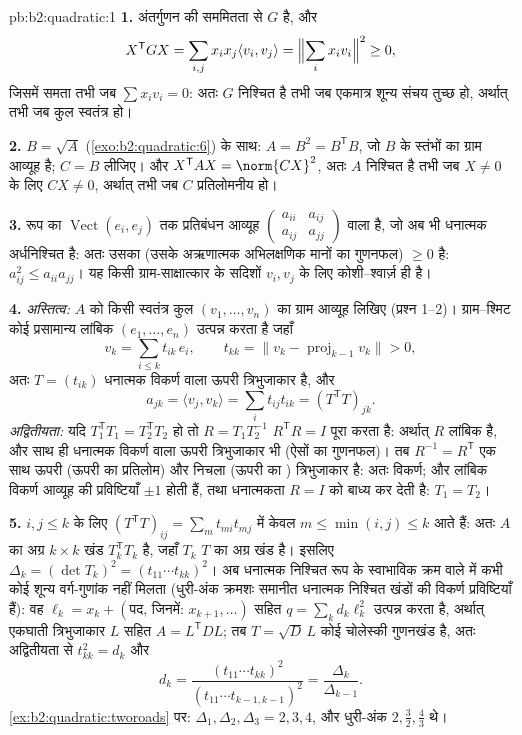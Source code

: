 \begin{solution}{pb:b2:quadratic:1}
\textbf{1.} अंतर्गुणन की सममितता से $G$  है, और
\[
X^{\mathsf T}GX = \sum_{i,j}x_ix_j\langle v_i, v_j\rangle
= \Bigl\|\sum_i x_iv_i\Bigr\|^2 \geq 0 ,
\]
जिसमें समता तभी जब $\sum x_iv_i = 0$: अतः $G$ निश्चित है तभी जब एकमात्र शून्य संचय
तुच्छ हो, अर्थात् तभी जब कुल स्वतंत्र हो।

\textbf{2.} $B = \sqrt A$ (\cref{exo:b2:quadratic:6}) के साथ: $A
= B^2 = B^{\mathsf T}B$, जो $B$ के स्तंभों का ग्राम आव्यूह है;
$C = B$ लीजिए। और $X^{\mathsf T}AX = \norm{CX}^2$, अतः $A$ निश्चित है तभी जब $X \neq 0$ के लिए $CX \neq 0$, अर्थात् तभी
जब $C$ प्रतिलोमनीय हो।

\textbf{3.} रूप का $\operatorname{Vect}(e_i, e_j)$ तक प्रतिबंधन आव्यूह $\begin{pmatrix} a_{ii} & a_{ij}\\ a_{ij} & a_{jj}
\end{pmatrix}$ वाला है, जो अब भी धनात्मक
अर्धनिश्चित है: अतः उसका  (उसके अऋणात्मक अभिलक्षणिक मानों का
गुणनफल) $\geq 0$ है: $a_{ij}^2 \leq a_{ii}a_{jj}$। यह किसी ग्राम-साक्षात्कार के सदिशों $v_i, v_j$ के लिए
कोशी--श्वार्ज़ ही है।

\textbf{4.} \emph{अस्तित्व:} $A$ को किसी स्वतंत्र कुल $(v_1, \dots, v_n)$ का ग्राम आव्यूह
लिखिए (प्रश्न 1--2)। ग्राम--श्मिट कोई प्रसामान्य लांबिक $(e_1, \dots, e_n)$ उत्पन्न करता
है जहाँ
\[
v_k = \sum_{i \leq k} t_{ik}\,e_i,
\qquad t_{kk} = \bigl\| v_k - \operatorname{proj}_{k-1}v_k
\bigr\| > 0 ,
\]
अतः $T = (t_{ik})$ धनात्मक विकर्ण वाला ऊपरी त्रिभुजाकार है, और
\[
a_{jk} = \langle v_j, v_k\rangle
= \sum_i t_{ij}t_{ik} = (T^{\mathsf T}T)_{jk} .
\]
\emph{अद्वितीयता:} यदि $T_1^{\mathsf T}T_1 = T_2^{\mathsf T}T_2$ हो तो $R = T_1T_2^{-1}$ $R^{\mathsf T}R = I$ पूरा करता है: अर्थात् $R$
लांबिक है, और साथ ही धनात्मक विकर्ण वाला ऊपरी त्रिभुजाकार भी (ऐसों का
गुणनफल)। तब $R^{-1} = R^{\mathsf T}$ एक साथ ऊपरी (ऊपरी का प्रतिलोम) और निचला (ऊपरी का
) त्रिभुजाकार है: अतः विकर्ण; और लांबिक विकर्ण आव्यूह की
प्रविष्टियाँ $\pm1$ होती हैं, तथा धनात्मकता $R = I$ को बाध्य कर देती है: $T_1 = T_2$।

\textbf{5.} $i, j \leq k$ के लिए $(T^{\mathsf T}T)_{ij} = \sum_m
t_{mi}t_{mj}$ में केवल $m \leq \min(i,j) \leq k$ आते हैं: अतः $A$ का अग्र $k\times k$ खंड
$T_k^{\mathsf T}T_k$ है, जहाँ $T_k$ $T$ का अग्र खंड है। इसलिए $\Delta_k = (\det T_k)^2
= (t_{11}\cdots t_{kk})^2$। अब धनात्मक निश्चित रूप के
स्वाभाविक क्रम वाले  में कभी कोई शून्य वर्ग-गुणांक नहीं मिलता
(धुरी-अंक क्रमशः समानीत धनात्मक निश्चित खंडों की विकर्ण प्रविष्टियाँ हैं):
वह $\ell_k = x_k + (\text{पद, जिनमें: }
x_{k+1}, \dots)$ सहित $q
= \sum_k d_k\ell_k^2$ उत्पन्न करता है, अर्थात् एकघाती
त्रिभुजाकार $L$ सहित $A = L^{\mathsf T}DL$; तब $T = \sqrt D\,L$ कोई चोलेस्की गुणनखंड है, अतः
अद्वितीयता से $t_{kk}^2 = d_k$ और
\[
d_k = \frac{(t_{11}\cdots t_{kk})^2}
{(t_{11}\cdots t_{k-1,k-1})^2}
= \frac{\Delta_k}{\Delta_{k-1}} .
\]
\cref{ex:b2:quadratic:tworoads} पर: $\Delta_1, \Delta_2,
\Delta_3 = 2, 3, 4$, और धुरी-अंक $2, \frac32, \frac43$ थे।


\end{solution}
